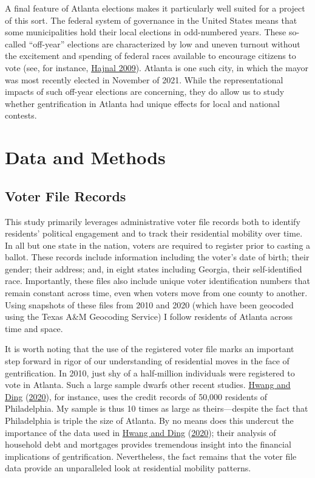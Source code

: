 \documentclass[
  12pt,
]{article}
\begin{document}
A final feature of Atlanta elections makes it particularly well suited for a project of this sort. The federal system of governance in the United States means that some municipalities hold their local elections in odd-numbered years. These so-called ``off-year'' elections are characterized by low and uneven turnout without the excitement and spending of federal races available to encourage citizens to vote (see, for instance, \protect\hyperlink{ref-Hajnal2009}{Hajnal 2009}). Atlanta is one such city, in which the mayor was most recently elected in November of 2021. While the representational impacts of such off-year elections are concerning, they do allow us to study whether gentrification in Atlanta had unique effects for local and national contests.

\hypertarget{data-and-methods}{%
\section{Data and Methods}\label{data-and-methods}}

\hypertarget{voter-file-records}{%
\subsection{Voter File Records}\label{voter-file-records}}

This study primarily leverages administrative voter file records both to identify residents' political engagement and to track their residential mobility over time. In all but one state in the nation, voters are required to register prior to casting a ballot. These records include information including the voter's date of birth; their gender; their address; and, in eight states including Georgia, their self-identified race. Importantly, these files also include unique voter identification numbers that remain constant across time, even when voters move from one county to another. Using snapshots of these files from 2010 and 2020 (which have been geocoded using the Texas A\&M Geocoding Service) I follow residents of Atlanta across time and space.

It is worth noting that the use of the registered voter file marks an important step forward in rigor of our understanding of residential moves in the face of gentrification. In 2010, just shy of a half-million individuals were registered to vote in Atlanta. Such a large sample dwarfs other recent studies. \protect\hyperlink{ref-Hwang2020}{Hwang and Ding} (\protect\hyperlink{ref-Hwang2020}{2020}), for instance, uses the credit records of 50,000 residents of Philadelphia. My sample is thus 10 times as large as theirs---despite the fact that Philadelphia is triple the size of Atlanta. By no means does this undercut the importance of the data used in \protect\hyperlink{ref-Hwang2020}{Hwang and Ding} (\protect\hyperlink{ref-Hwang2020}{2020}); their analysis of household debt and mortgages provides tremendous insight into the financial implications of gentrification. Nevertheless, the fact remains that the voter file data provide an unparalleled look at residential mobility patterns.
\end{document}
